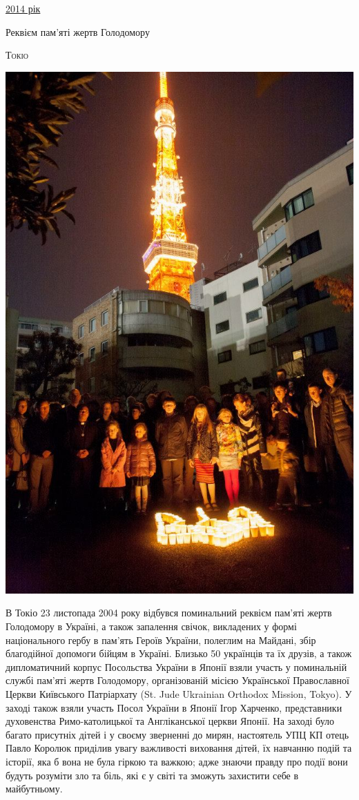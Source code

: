 \documentclass[10pt,a4paper]{article}
\newcommand{\Category}[1]{%
		\begin{center}	
			\Large \usefont{T2A}{kurier}{m}{n}
			\underline{#1}%
		\end{center}	
		\par \normalsize \normalfont}
\newcommand{\NewsItem}[1]{%
		\usefont{T2A}{iwona}{m}{n} 
		\large #1 \vspace{4pt}
		\par \normalsize \normalfont}
\newcommand{\NewsAuthor}[1]{%
			\hfill \textsc{#1} \vspace{4pt}
			\par \normalfont}
\begin{document}
\Category{2014 рік}
\begin{multicols}{3}

\NewsItem{Реквієм пам'яті жертв Голодомору}
\NewsAuthor{Токіо}
		\begin{center}
			\includegraphics[width=0.8\linewidth]{images/rekviem}
		\end{center}
В Токіо 23 листопада 2004 року відбувся поминальний реквієм пам'яті жертв Голодомору в Україні, а також запалення свічок, викладених у формі національного гербу в пам'ять Героїв України, полеглим на Майдані, збір благодійної допомоги бійцям в Україні.
Близько 50 українців та їх друзів, а також дипломатичний корпус Посольства України в Японії взяли участь у поминальній службі пам'яті жертв Голодомору, організованій місією Української Православної Церкви Київського Патріархату (St. Jude Ukrainian Orthodox Mission, Tokyo). У заході також взяли участь Посол України в Японії Ігор Харченко, представники духовенства Римо-католицької та Англіканської церкви Японії.
На заході було багато присутніх дітей і у своєму зверненні до мирян, настоятель УПЦ КП отець Павло Королюк приділив увагу важливості виховання дітей, їх навчанню подій та історії, яка б вона не була гіркою та важкою; адже знаючи правду про події вони будуть розуміти зло та біль, які є у світі та зможуть захистити себе в майбутньому.

\end{multicols}
\end{document}
